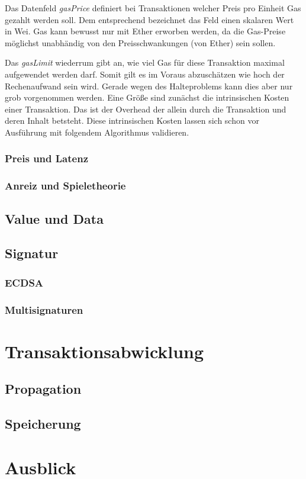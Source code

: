 \documentclass{llncs}
\begin{document}
Das Datenfeld \textit{gasPrice} definiert bei Transaktionen welcher Preis pro Einheit Gas gezahlt werden soll. Dem entsprechend bezeichnet das Feld einen skalaren Wert in Wei. Gas kann bewusst nur mit Ether erworben werden, da die Gas-Preise möglichst unabhändig von den Preisschwankungen (von Ether) sein sollen. \cite[S. 7]{wood_ethereum/yellowpaper_2019}

Das \textit{gasLimit} wiederrum gibt an, wie viel Gas für diese Transaktion maximal aufgewendet werden darf. Somit gilt es im Voraus abzuschätzen wie hoch der Rechenaufwand sein wird. Gerade wegen des Halteproblems kann dies aber nur grob vorgenommen werden. Eine Größe sind zunächst die intrinsischen Kosten einer Transaktion. Das ist der Overhead der allein durch die Transaktion und deren Inhalt betsteht. Diese intrinsischen Kosten lassen sich schon vor Ausführung mit folgendem Algorithmus validieren. 

\subsubsection{Preis und Latenz}

\subsubsection{Anreiz und Spieletheorie}

\subsection{Value und Data}

\subsection{Signatur}

\subsubsection{ECDSA}

\subsubsection{Multisignaturen}

\section{Transaktionsabwicklung}

\subsection{Propagation}

\subsection{Speicherung}

\section{Ausblick}



\end{document}
